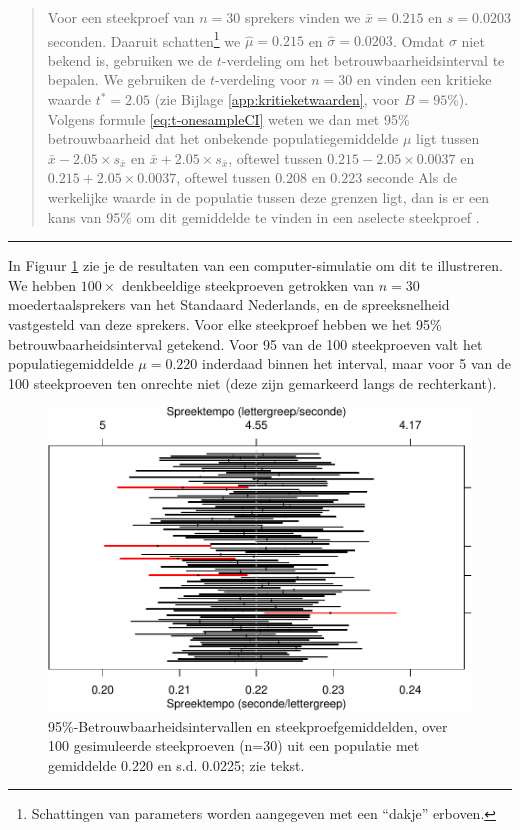 \documentclass[
]{book}
\begin{document}
\begin{quote}
Voor een steekproef van \(n=30\) sprekers vinden we \(\bar{x}=0.215\) en
\(s=0.0203\) seconden. Daaruit schatten\footnote{Schattingen van parameters worden aangegeven met een ``dakje'' erboven.} we \(\hat{\mu}=0.215\) en
\(\hat{\sigma}=0.0203\). Omdat \(\sigma\) niet bekend is, gebruiken we de
\(t\)-verdeling om het betrouwbaarheidsinterval te bepalen. We gebruiken
de \(t\)-verdeling voor \(n=30\) en vinden een kritieke waarde \(t^*=2.05\)
(zie
Bijlage \ref{app:kritieketwaarden}, voor \(B=95\)\%).
Volgens
formule \eqref{eq:t-onesampleCI} weten we dan met 95\% betrouwbaarheid dat het onbekende populatiegemiddelde \(\mu\) ligt tussen
\(\bar{x}-2.05\times s_{\bar{x}}\) en \(\bar{x}+2.05\times s_{\bar{x}}\),
oftewel tussen \(0.215-2.05\times0.0037\) en \(0.215+2.05\times0.0037\),
oftewel tussen \(0.208\) en \(0.223\) seconde
Als de werkelijke waarde in de populatie tussen deze grenzen ligt, dan is er een kans van 95\% om dit gemiddelde te vinden in een aselecte steekproef \citep[p.241]{Spie19}.
\end{quote}

\begin{center}\rule{0.5\linewidth}{0.5pt}\end{center}

In Figuur \ref{fig:tempo95CIs} zie je de resultaten van een
computer-simulatie om dit te illustreren. We hebben \(100\times\)
denkbeeldige steekproeven getrokken van \(n=30\) moedertaalsprekers van
het Standaard Nederlands, en de spreeksnelheid vastgesteld van deze
sprekers. Voor elke steekproef hebben we het 95\%
betrouwbaarheidsinterval getekend. Voor 95 van de 100 steekproeven valt
het populatiegemiddelde \(\mu=0.220\) inderdaad binnen het interval, maar
voor 5 van de 100 steekproeven ten onrechte niet (deze zijn gemarkeerd
langs de rechterkant).

\begin{figure}
\centering
\includegraphics{KMS-NL_files/figure-latex/tempo95CIs-1.pdf}
\caption{\label{fig:tempo95CIs}95\%-Betrouwbaarheidsintervallen en steekproefgemiddelden, over 100 gesimuleerde steekproeven (n=30) uit een populatie met gemiddelde 0.220 en s.d. 0.0225; zie tekst.}
\end{figure}
\end{document}
